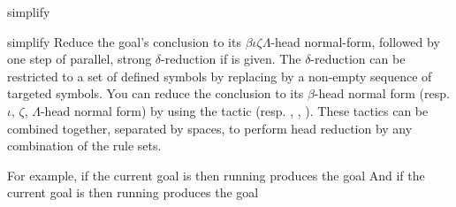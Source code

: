 \begin{tactic}{simplify}
  \begin{tsyntax}[empty]{simplify}
    Reduce the goal's conclusion to its $\beta\iota\zeta\Lambda$-head
    normal-form, followed by one step of parallel, strong
    $\delta$-reduction if  is given.  The $\delta$-reduction
    can be restricted to a set of defined symbols by replacing
     by a non-empty sequence of targeted symbols. You can
    reduce the conclusion to its $\beta$-head normal form
    (resp. $\iota$, $\zeta$, $\Lambda$-head normal form) by using the
    tactic  (resp. , , ). These
    tactics can be combined together, separated by spaces, to perform
    head reduction by any combination of the rule sets.

  For example, if the current goal is
   then
  running 
  produces the goal
  And if the current goal is
   then
  running 
  produces the goal
  \end{tsyntax}
\end{tactic}
